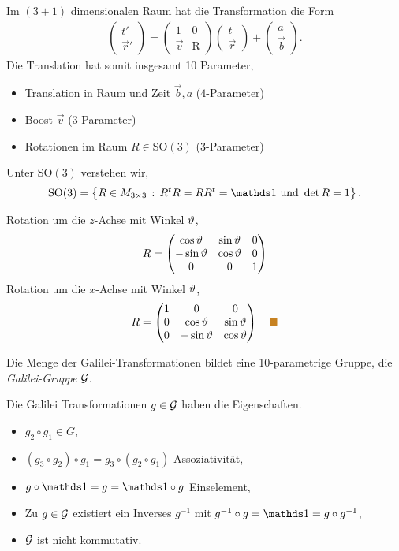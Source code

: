 Im $(3+1)$ dimensionalen Raum hat die Transformation die Form
\begin{align*}
\begin{pmatrix}
t'\\
\vec{r}'
\end{pmatrix}
= \begin{pmatrix}
  1 & 0 \\
  \vec{v} & \mathrm{R} 
  \end{pmatrix}
\begin{pmatrix}
t\\
\vec{r}
\end{pmatrix}
+ \begin{pmatrix}
  a\\\vec{b}
  \end{pmatrix}.
\end{align*}
Die Translation hat somit insgesamt 10 Parameter,
\begin{itemize}[label=]
  \item Translation in Raum und Zeit $\vec{b}, a$ ($4$-Parameter)
  \item Boost $\vec{v}$ ($3$-Parameter)
  \item Rotationen im Raum $R\in\mathrm{SO}(3)$ ($3$-Parameter)
\end{itemize}
Unter $\mathrm{SO}(3)$ verstehen wir,
\begin{align*}
\mathrm{SO}(3) = \setdef{R\in M_{3\times 3}}{R^tR = RR^t = \Id\text{ und }\det
R = 1}.
\end{align*}
\begin{bsp}
Rotation um die $z$-Achse mit Winkel $\vartheta$,
\begin{align*}
R = \begin{pmatrix}
\cos \vartheta & \sin \vartheta & 0\\
-\sin\vartheta & \cos \vartheta & 0\\
0 & 0 & 1
\end{pmatrix}
\end{align*}
Rotation um die $x$-Achse mit Winkel $\vartheta$,
\begin{align*}
R = \begin{pmatrix}
    1& 0 & 0 \\
0 & \cos \th & \sin \th\\
0 & -\sin\th & \cos \th
\end{pmatrix}\bsphere
\end{align*}
\end{bsp}
Die Menge der Galilei-Transformationen bildet eine 10-parametrige Gruppe, die
\emph{Galilei-Gruppe} $\mathcal{G}$.
\begin{bemn}
Die Galilei Transformationen $g\in\mathcal{G}$ haben die Eigenschaften.
\begin{itemize}[label=]
  \item $g_2\circ g_1\in G$,
  \item $(g_3\circ g_2)\circ g_1 = g_3 \circ (g_2\circ g_1)$ Assoziativität,
  \item $g\circ\Id = g = \Id \circ g$ Einselement,
  \item Zu $g\in\mathcal{G}$ existiert ein Inverses $g^{-1}$ mit $g^{-1}\circ g = \Id =
  g \circ g^{-1}$,
  \item $\mathcal{G}$ ist nicht kommutativ.\maphere
\end{itemize} 
\end{bemn}
